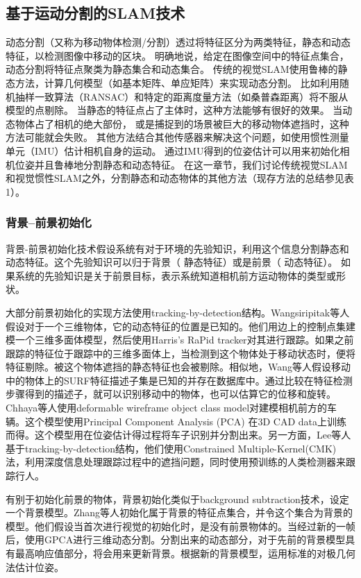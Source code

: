 \subsection{基于运动分割的SLAM技术}
\label{subsec:motion_segmentation}

动态分割（又称为移动物体检测/分割\cite{Derome15UnmannedSyst, Klappstein09, Kundu09}）透过将特征区分为两类特征，静态和动态特征，以检测图像中移动的区块。
明确地说，给定在图像空间中的特征点集合，动态分割将特征点聚类为静态集合和动态集合。
传统的视觉SLAM使用鲁棒的静态方法，计算几何模型（如基本矩阵、单应矩阵）来实现动态分割。
比如利用随机抽样一致算法（RANSAC）\cite{37}和特定的距离度量方法（如桑普森距离\cite{59}）将不服从模型的点剔除。
当静态的特征点占了主体时，这种方法能够有很好的效果。
当动态物体占了相机的绝大部份， 或是捕捉到的场景被巨大的移动物体遮挡时，这种方法可能就会失败。
其他方法结合其他传感器来解决这个问题，如使用惯性测量单元（IMU）估计相机自身的运动\cite{67, 92}。
通过IMU得到的位姿估计可以用来初始化相机位姿并且鲁棒地分割静态和动态特征。
在这一章节，我们讨论传统视觉SLAM和视觉惯性SLAM之外，分割静态和动态物体的其他方法（现存方法的总结参见表1）。

\subsubsection{背景--前景初始化}
背景-前景初始化技术假设系统有对于环境的先验知识，利用这个信息分割静态和动态特征。这个先验知识可以归于背景（ 静态特征）或是前景（ 动态特征）。
如果系统的先验知识是关于前景目标，表示系统知道相机前方运动物体的类型或形状。

大部分前景初始化的实现方法使用tracking-by-detection结构\cite{14, 89}。Wangsiripitak等人\cite{173}假设对于一个三维物体，它的动态特征的位置是已知的。他们用边上的控制点集建模一个三维多面体模型，然后使用Harris’s RaPid tracker\cite{56}对其进行跟踪。如果之前跟踪的特征位于跟踪中的三维多面体上，当检测到这个物体处于移动状态时，便将特征剔除。被这个物体遮挡的静态特征也会被剔除。相似地，Wang等人\cite{172}假设移动中的物体上的SURF特征描述子集是已知的并存在数据库中。通过比较在特征检测步骤得到的描述子，就可以识别移动中的物体，也可以估算它的位移和旋转。Chhaya等人\cite{21}使用deformable wireframe object class model对建模相机前方的车辆。这个模型使用Principal Component Analysis (PCA) 在3D CAD data上训练而得。这个模型用在位姿估计得过程将车子识别并分割出来。另一方面，Lee等人\cite{89, 90}基于tracking-by-detection结构，他们使用Constrained Multiple-Kernel(CMK)法，利用深度信息处理跟踪过程中的遮挡问题，同时使用预训练的人类检测器来跟踪行人。

有别于初始化前景的物体，背景初始化类似于background subtraction技术，设定一个背景模型\cite{7,126}。Zhang等人\cite{184}初始化属于背景的特征点集合，并令这个集合为背景的模型。他们假设当首次进行视觉的初始化时，是没有前景物体的。当经过新的一帧后，使用GPCA\cite{165}进行三维动态分割。分割出来的动态部分，对于先前的背景模型具有最高响应值部分，将会用来更新背景。根据新的背景模型，运用标准的对极几何法估计位姿。

